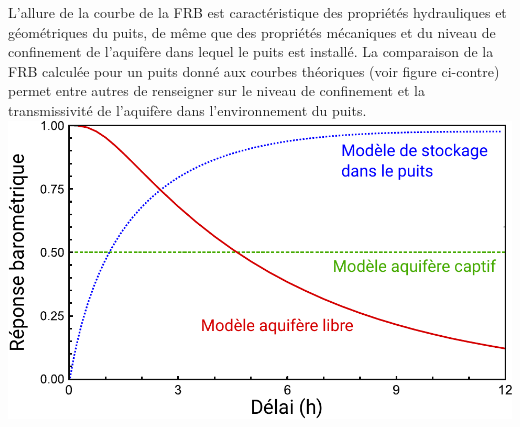 \begin{tcbposter}[
poster = {
  columns = 1,
  rows = 2,
  height= \textheight,
  width = \textwidth},
boxes = {
  colback=white, colframe=white, coltitle=blue, arc=0pt}
]
{  \indent L'allure de la courbe de la FRB est caractéristique des propriétés 
  hydrauliques et géométriques du puits, de même que des propriétés mécaniques 
  et du niveau de confinement de l'aquifère dans lequel le puits est installé. 
  La comparaison de la FRB calculée pour un puits donné aux courbes 
  théoriques (voir figure ci-contre) permet entre autres de renseigner sur le 
  niveau de confinement et la transmissivité de l'aquifère dans 
  l'environnement du puits.
  \tcblower
  \includegraphics[width=\linewidth]{D113 Spane_2002.pdf}
  }
\end{tcbposter}
\clearpage
